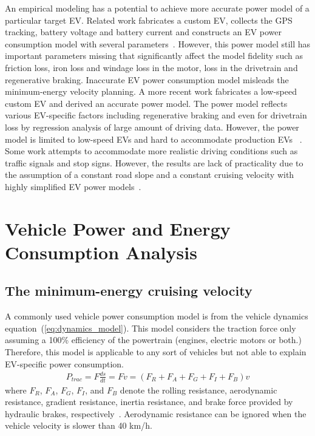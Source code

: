 \documentclass{IEEEtran}
\begin{document}
An empirical modeling has a potential to achieve more accurate power model  of a particular target EV. Related work fabricates a custom EV, collects the GPS tracking, battery voltage and battery current and constructs an EV power consumption model with several parameters~\cite{Dib:IVPPC11}. However, this power model still has important parameters missing that significantly affect the model fidelity such as friction loss, iron loss and windage loss in the motor, loss in the drivetrain and regenerative braking. Inaccurate EV power consumption model misleads the minimum-energy velocity planning. A more recent work fabricates a low-speed custom EV and derived an accurate power model. The power model reflects various EV-specific factors including regenerative braking and even for drivetrain loss by regression analysis of large amount of driving data. However, the power model is limited to low-speed EVs and hard to accommodate production EVs ~\cite{Hong:ASPDAC16}. 
Some work attempts to accommodate more realistic driving conditions such as traffic signals and stop signs. However, the results are lack of practicality due to the assumption of a constant road slope and a constant cruising velocity with highly simplified EV power models~\cite{Yan:NAPS14, Dib:CEP14, Wu:ITS15}.


\section{Vehicle Power and Energy Consumption Analysis} \label{sec:energy consumption}

\subsection{The minimum-energy cruising velocity} \label{subsec:opt-cruising}

A commonly used vehicle power consumption model is from the vehicle dynamics equation~(\ref{eq:dynamics_model}). This model considers the traction force only assuming a 100\% efficiency of the powertrain (engines, electric motors or both.) Therefore, this model is applicable to any sort of vehicles but not able to explain EV-specific power consumption.
%
\begin{equation}  \label{eq:dynamics_model} %
\begin{split}
P_{trac} 	= F \frac{ds}{dt} = Fv= (F_{R} + F_{A} + F_{G} + F_{I} + F_{B}) v
\end{split}
\end{equation}
where $F_R$, $F_A$, $F_G$, $F_I$, and $F_B$ denote the rolling resistance, aerodynamic resistance, gradient resistance, inertia resistance, and brake force provided by hydraulic brakes, respectively~\cite{Park:DAC13}. Aerodynamic resistance can be ignored when the vehicle velocity is slower than 40 km/h.
\end{document}
